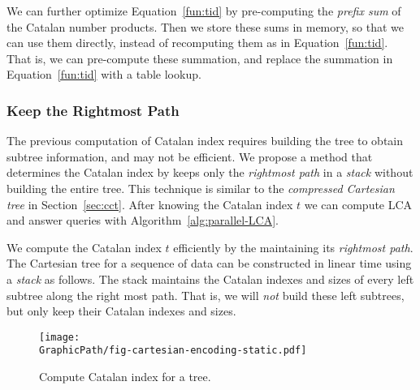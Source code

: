 % 



We can further optimize Equation~\ref{fun:tid} by pre-computing the
{\em prefix sum} of the Catalan number products.  Then we store these
sums in memory, so that we can use them directly, instead of
recomputing them as in Equation~\ref{fun:tid}.  That is, we can
pre-compute these summation, and replace the summation in
Equation~\ref{fun:tid} with a table lookup.


\subsubsection{Keep the Rightmost Path}

The previous computation of Catalan index requires building the tree
to obtain subtree information, and may not be efficient.  We propose a
method that determines the Catalan index by keeps only the {\em
  rightmost path} in a {\em stack} without building the entire tree.
This technique is similar to the {\em compressed Cartesian tree} in
Section~\ref{sec:cct}.  After knowing the Catalan index $t$ we can
compute LCA and answer queries with Algorithm~\ref{alg:parallel-LCA}.

We compute the Catalan index $t$ efficiently by the maintaining its
{\em rightmost path}.  The Cartesian tree for a sequence of data can
be constructed in linear time using a {\em stack} as follows.  The
stack maintains the Catalan indexes and sizes of every left subtree
along the right most path.  That is, we will {\em not} build these
left subtrees, but only keep their Catalan indexes and sizes.

\begin{figure}[!thb]
  \centering
  \texttt{[image: \\GraphicPath/fig-cartesian-encoding-static.pdf]}
  \caption{Compute Catalan index for a tree.}
  \label{fig:fig-cartesian-encoding-static}
\end{figure}

